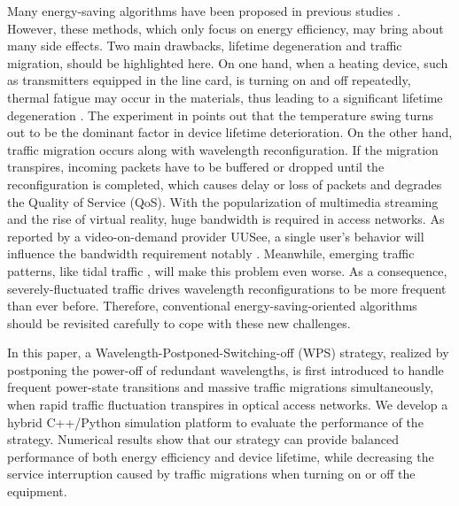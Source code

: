\documentclass[letter]{IEEEtran}
\begin{document}
Many energy-saving algorithms have been proposed in previous studies \cite{6802896,6320604,7249119}. However, these methods, which only focus on energy efficiency, may bring about many side effects. Two main drawbacks, lifetime degeneration and traffic migration, should be highlighted here. On one hand, when a heating device, such as transmitters equipped in the line card, is turning on and off repeatedly, thermal fatigue may occur in the materials, thus leading to a significant lifetime degeneration \cite{kressel2006semiconductor}. The experiment in \cite{schulz2012thermal} points out that the temperature swing turns out to be the dominant factor in device lifetime deterioration. On the other hand, traffic migration occurs along with wavelength reconfiguration. If the migration transpires, incoming packets have to be buffered or dropped until the reconfiguration is completed, which causes delay or loss of packets and degrades the Quality of Service (QoS). With the popularization of multimedia streaming and the rise of virtual reality, huge bandwidth is required in access networks. As reported by a video-on-demand provider UUSee, a single user's behavior will influence the bandwidth requirement notably \cite{6195785}. Meanwhile, emerging traffic patterns, like tidal traffic \cite{7444562}, will make this problem even worse.  As a consequence, severely-fluctuated traffic drives wavelength reconfigurations to be more frequent than ever before. Therefore, conventional energy-saving-oriented algorithms should be revisited carefully to cope with these new challenges.

In this paper, a Wavelength-Postponed-Switching-off (WPS) strategy, realized by postponing the power-off of redundant wavelengths, is first introduced to handle frequent power-state transitions and massive traffic migrations simultaneously, when rapid traffic fluctuation transpires in optical access networks. We develop a hybrid C++/Python simulation platform to evaluate the performance of the strategy. Numerical results show that our strategy can provide balanced performance of both energy efficiency and device lifetime, while decreasing the service interruption caused by traffic migrations when turning on or off the equipment.


 

\end{document}
